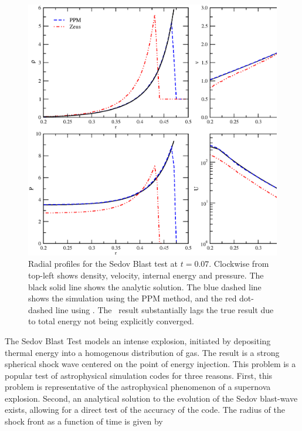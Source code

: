 \begin{figure}
\begin{center}
\includegraphics[width=\textwidth]{figures/sedov-profiles.eps}
\caption{Radial profiles for the Sedov Blast test at $t =
0.07$. Clockwise from top-left shows density, velocity, internal
energy and pressure.  The black solid line shows the analytic
solution.  The blue dashed line shows the simulation using the PPM
method, and the red dot-dashed line using \zeus.  The \zeus\ result
substantially lags the true result due to total energy not being
explicitly converged.}
\label{fig.sedov2}
\end{center}
\end{figure}

The Sedov Blast Test \citep{Sedov1959} models an intense explosion,
initiated by depositing thermal energy into a homogenous distribution
of gas. The result is a strong spherical shock wave centered on the
point of energy injection.  This problem is a popular test of
astrophysical simulation codes for three reasons.  First, this problem
is representative of the astrophysical phenomenon of a supernova
explosion.   Second, an analytical solution to the evolution of the
Sedov blast-wave exists, allowing for a direct test of the accuracy of
the code.  The radius of the shock front as a function of time is
given by

